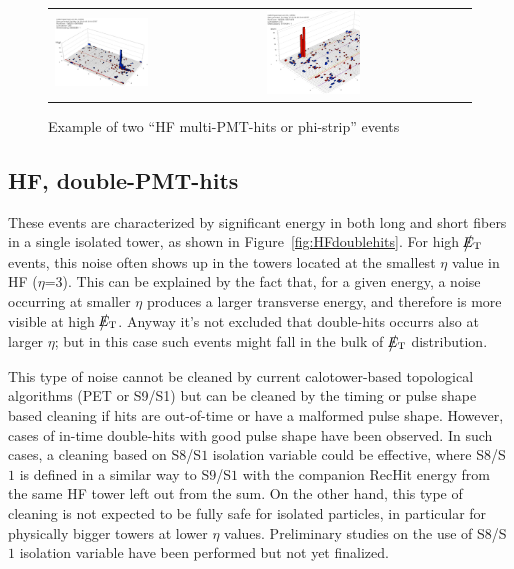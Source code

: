 %
\begin{figure}[h]
 \centering
 \begin{tabular}{ll}
   \includegraphics[width=0.47\textwidth]{fig/HFmultiHits.eps} &
   \includegraphics[width=0.47\textwidth]{fig/HFmultiHits_2.eps} \\
 \end{tabular}
\caption{Example of two ``HF multi-PMT-hits or phi-strip'' events}
\label{fig:HFmultiHits}
\end{figure}

\subsection{HF, double-PMT-hits}
These events are characterized by significant energy in both long and short fibers in a single
isolated tower, as shown in Figure~\ref{fig:HFdoublehits}. For high $\big\slash\hspace{-1.6ex}{E_\text{T}}$ events, 
this noise often shows up in the towers located at the smallest $\eta$ 
value in HF ($\eta$=3). This can be explained by the fact that, for a given energy, 
a noise occurring at smaller $\eta$ produces a larger transverse energy, and therefore is more visible at high $\big\slash\hspace{-1.6ex}{E_\text{T}}$.
Anyway it's not excluded that double-hits occurrs also at larger $\eta$; but in this case such events might 
fall in the bulk of $\big\slash\hspace{-1.6ex}{E_\text{T}}$ distribution.

This type of noise cannot be cleaned by current calotower-based topological algorithms (PET or S9/S1) but can
be cleaned by the timing or pulse shape based cleaning if hits are out-of-time or have a malformed pulse shape.
However, cases of in-time double-hits with good pulse shape have been observed. In such cases, a cleaning based on
S$8$/S$1$ isolation variable could be effective, where S$8$/S$1$ is defined in a similar way to S$9$/S$1$
with the companion RecHit energy from the same HF tower left out from the sum. 
On the other hand, this type of cleaning is not expected to be fully safe for isolated particles, 
in particular for physically bigger towers at lower $\eta$ values. 
Preliminary studies on the use of S$8$/S$1$ isolation variable have been performed but not yet finalized. 

